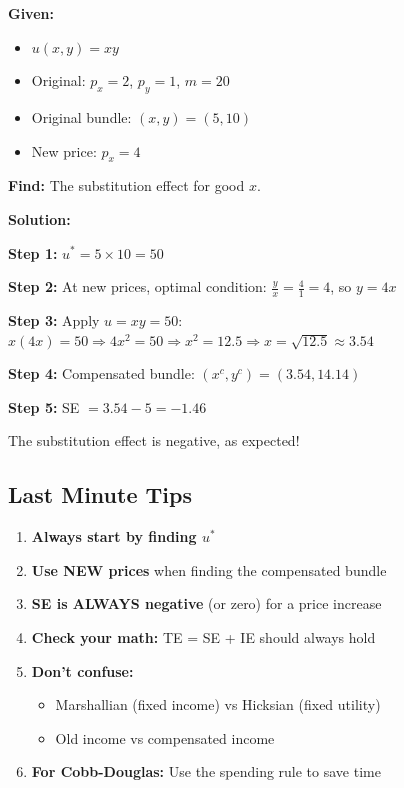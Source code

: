 \documentclass[11pt]{article}
\begin{document}
\textbf{Given:}
\begin{itemize}
    \item $u(x, y) = xy$
    \item Original: $p_x = 2$, $p_y = 1$, $m = 20$
    \item Original bundle: $(x, y) = (5, 10)$
    \item New price: $p_x = 4$
\end{itemize}

\textbf{Find:} The substitution effect for good $x$.

\vspace{2em}

\textbf{Solution:}

\textbf{Step 1:} $u^* = 5 \times 10 = 50$

\textbf{Step 2:} At new prices, optimal condition: $\frac{y}{x} = \frac{4}{1} = 4$, so $y = 4x$

\textbf{Step 3:} Apply $u = xy = 50$: $x(4x) = 50 \Rightarrow 4x^2 = 50 \Rightarrow x^2 = 12.5 \Rightarrow x = \sqrt{12.5} \approx 3.54$

\textbf{Step 4:} Compensated bundle: $(x^c, y^c) = (3.54, 14.14)$

\textbf{Step 5:} SE $= 3.54 - 5 = -1.46$

\vspace{1em}

The substitution effect is negative, as expected!

\subsection{Last Minute Tips}

\begin{enumerate}[leftmargin=2cm, itemsep=1em]
    \item \textbf{Always start by finding $u^*$}

    \item \textbf{Use NEW prices} when finding the compensated bundle

    \item \textbf{SE is ALWAYS negative} (or zero) for a price increase

    \item \textbf{Check your math:} TE = SE + IE should always hold

    \item \textbf{Don't confuse:}
    \begin{itemize}
        \item Marshallian (fixed income) vs Hicksian (fixed utility)
        \item Old income vs compensated income
    \end{itemize}

    \item \textbf{For Cobb-Douglas:} Use the spending rule to save time
\end{enumerate}
\end{document}
